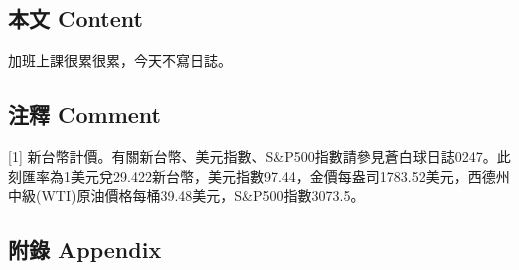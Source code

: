 \documentclass[
]{article}
\begin{document}
\hypertarget{ux672cux6587-content-25}{%
\subsection{本文 Content}\label{ux672cux6587-content-25}}

加班上課很累很累，今天不寫日誌。

\hypertarget{ux6ce8ux91cb-comment-25}{%
\subsection{注釋 Comment}\label{ux6ce8ux91cb-comment-25}}

{[}1{]}
新台幣計價。有關新台幣、美元指數、S\&P500指數請參見蒼白球日誌0247。此刻匯率為1美元兌29.422新台幣，美元指數97.44，金價每盎司1783.52美元，西德州中級(WTI)原油價格每桶39.48美元，S\&P500指數3073.5。

\hypertarget{ux9644ux9304-appendix-25}{%
\subsection{附錄 Appendix}\label{ux9644ux9304-appendix-25}}
\end{document}
